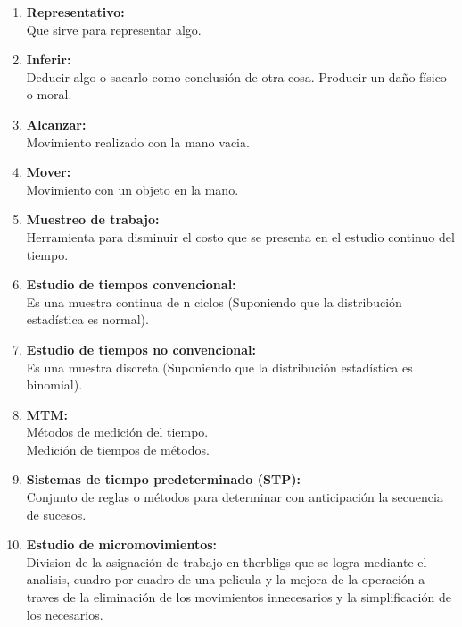 \begin{enumerate}
    \item  \textbf {Representativo:}
    \\Que sirve para representar algo.
   
    \item \textbf{ Inferir:}
    \\Deducir algo o sacarlo como conclusión de otra cosa. Producir un daño físico o moral.
  
    \item  \textbf {Alcanzar: }
    \\Movimiento realizado con la mano vacia.
    
    \item  \textbf {Mover:}
    \\Movimiento con un objeto en la mano.
   
    \item  \textbf {Muestreo de trabajo: }
    \\Herramienta para disminuir el costo que se presenta en el estudio continuo del tiempo.
    
    \item  \textbf {Estudio de tiempos convencional: }
    \\Es una muestra continua de n ciclos (Suponiendo que la distribución estadística es normal).
    
    \item \textbf{ Estudio de tiempos no convencional:} 
    \\Es una muestra discreta (Suponiendo que la distribución estadística es binomial).
   \item \textbf{MTM: }
    \\Métodos de medición del tiempo.
    \\Medición de tiempos de métodos.
 \item \textbf{Sistemas de tiempo predeterminado (STP): }
    \\ Conjunto de reglas o métodos para determinar con anticipación la secuencia de sucesos.
    
    \item \textbf{Estudio de micromovimientos: }
    \\Division de la asignación de trabajo en therbligs que se logra mediante el analisis, cuadro por cuadro de una pelicula y la mejora de la operación a traves de la eliminación de los movimientos innecesarios y la simplificación de los necesarios.
\end{enumerate}


 
 